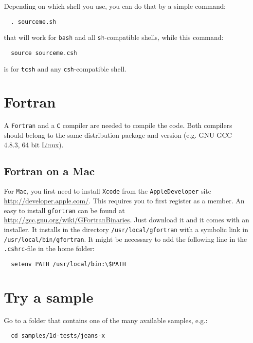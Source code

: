 \documentclass[a4paper,12pt]{article}
\begin{document}
Depending on which shell you use, you can do that by a simple command:

\begin{verbatim}
  . sourceme.sh
\end{verbatim}

that will work for \verb|bash| and all \verb|sh|-compatible shells, while this command:

\begin{verbatim}
  source sourceme.csh
\end{verbatim}

is for \verb|tcsh| and any \verb|csh|-compatible shell.


\section{Fortran}

A \verb|Fortran| and a \verb|C| compiler are needed to compile the code.
Both compilers should belong to the same distribution package and version (e.g. GNU GCC 4.8.3, 64 bit Linux).

\subsection{Fortran on a Mac}
For \verb|Mac|, you first need to install \verb|Xcode| from the \verb|AppleDeveloper|
site \url{http://developer.apple.com/}. This requires you to first register as a
member. An easy to install \verb|gfortran| can be found at \newline
\url{http://gcc.gnu.org/wiki/GFortranBinaries}. Just download it and it comes
with an installer. It installs in the directory \verb|/usr/local/gfortran| with
a symbolic link in \verb|/usr/local/bin/gfortran|. It might be necessary to add
the following line in the \verb|.cshrc|-file in the home folder:
\begin{verbatim} 
  setenv PATH /usr/local/bin:\$PATH 
\end{verbatim}


\section{Try a sample}

Go to a folder that contains one of the many available samples, e.g.:

\begin{verbatim}
  cd samples/1d-tests/jeans-x
\end{verbatim}
\end{document}
